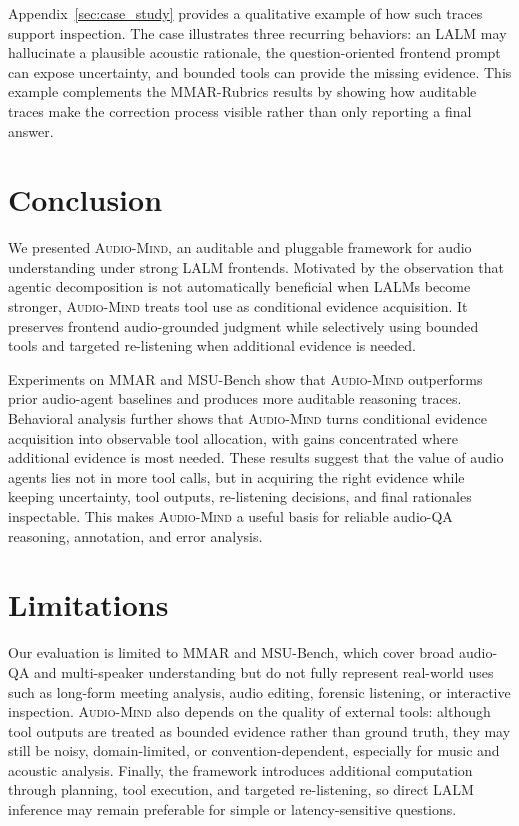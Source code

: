 \documentclass[11pt]{article}
\newcommand{\ours}{\textsc{Audio-Mind}}
\begin{document}
Appendix~\ref{sec:case_study} provides a qualitative example of how such traces support inspection. The case illustrates three recurring behaviors: an LALM may hallucinate a plausible acoustic rationale, the question-oriented frontend prompt can expose uncertainty, and bounded tools can provide the missing evidence. This example complements the MMAR-Rubrics results by showing how auditable traces make the correction process visible rather than only reporting a final answer.

\section{Conclusion}

We presented \ours{}, an auditable and pluggable framework for audio understanding under strong LALM frontends. Motivated by the observation that agentic decomposition is not automatically beneficial when LALMs become stronger, \ours{} treats tool use as conditional evidence acquisition. It preserves frontend audio-grounded judgment while selectively using bounded tools and targeted re-listening when additional evidence is needed.

Experiments on MMAR and MSU-Bench show that \ours{} outperforms prior audio-agent baselines and produces more auditable reasoning traces. Behavioral analysis further shows that \ours{} turns conditional evidence acquisition into observable tool allocation, with gains concentrated where additional evidence is most needed. These results suggest that the value of audio agents lies not in more tool calls, but in acquiring the right evidence while keeping uncertainty, tool outputs, re-listening decisions, and final rationales inspectable. This makes \ours{} a useful basis for reliable audio-QA reasoning, annotation, and error analysis.

\newpage
\section*{Limitations}

Our evaluation is limited to MMAR and MSU-Bench, which cover broad audio-QA and multi-speaker understanding but do not fully represent real-world uses such as long-form meeting analysis, audio editing, forensic listening, or interactive inspection. \ours{} also depends on the quality of external tools: although tool outputs are treated as bounded evidence rather than ground truth, they may still be noisy, domain-limited, or convention-dependent, especially for music and acoustic analysis. Finally, the framework introduces additional computation through planning, tool execution, and targeted re-listening, so direct LALM inference may remain preferable for simple or latency-sensitive questions.
\end{document}
